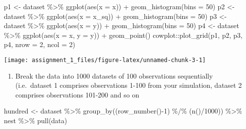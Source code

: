 \documentclass[
]{article}
\newenvironment{Shaded}{\begin{snugshade}}{\end{snugshade}}
\newcommand{\AttributeTok}[1]{\textcolor[rgb]{0.77,0.63,0.00}{#1}}
\newcommand{\DecValTok}[1]{\textcolor[rgb]{0.00,0.00,0.81}{#1}}
\newcommand{\FunctionTok}[1]{\textcolor[rgb]{0.00,0.00,0.00}{#1}}
\newcommand{\NormalTok}[1]{#1}
\newcommand{\OtherTok}[1]{\textcolor[rgb]{0.56,0.35,0.01}{#1}}
\newcommand{\SpecialCharTok}[1]{\textcolor[rgb]{0.00,0.00,0.00}{#1}}
\providecommand{\tightlist}{%
  \setlength{\itemsep}{0pt}\setlength{\parskip}{0pt}}
\begin{document}
\normalsize

\small

\begin{Shaded}
\begin{Highlighting}[]
\NormalTok{p1 }\OtherTok{\textless{}{-}}\NormalTok{ dataset }\SpecialCharTok{\%\textgreater{}\%}
    \FunctionTok{ggplot}\NormalTok{(}\FunctionTok{aes}\NormalTok{(}\AttributeTok{x =}\NormalTok{ x)) }\SpecialCharTok{+} \FunctionTok{geom\_histogram}\NormalTok{(}\AttributeTok{bins =} \DecValTok{50}\NormalTok{)}
\NormalTok{p2 }\OtherTok{\textless{}{-}}\NormalTok{ dataset }\SpecialCharTok{\%\textgreater{}\%}
    \FunctionTok{ggplot}\NormalTok{(}\FunctionTok{aes}\NormalTok{(}\AttributeTok{x =}\NormalTok{ x\_sq)) }\SpecialCharTok{+} \FunctionTok{geom\_histogram}\NormalTok{(}\AttributeTok{bins =} \DecValTok{50}\NormalTok{)}
\NormalTok{p3 }\OtherTok{\textless{}{-}}\NormalTok{ dataset }\SpecialCharTok{\%\textgreater{}\%}
    \FunctionTok{ggplot}\NormalTok{(}\FunctionTok{aes}\NormalTok{(}\AttributeTok{x =}\NormalTok{ y)) }\SpecialCharTok{+} \FunctionTok{geom\_histogram}\NormalTok{(}\AttributeTok{bins =} \DecValTok{50}\NormalTok{)}
\NormalTok{p4 }\OtherTok{\textless{}{-}}\NormalTok{ dataset }\SpecialCharTok{\%\textgreater{}\%}
    \FunctionTok{ggplot}\NormalTok{(}\FunctionTok{aes}\NormalTok{(}\AttributeTok{x =}\NormalTok{ x, }\AttributeTok{y =}\NormalTok{ y)) }\SpecialCharTok{+} \FunctionTok{geom\_point}\NormalTok{()}
\NormalTok{cowplot}\SpecialCharTok{::}\FunctionTok{plot\_grid}\NormalTok{(p1, p2, p3, p4, }\AttributeTok{nrow =} \DecValTok{2}\NormalTok{, }\AttributeTok{ncol =} \DecValTok{2}\NormalTok{)}
\end{Highlighting}
\end{Shaded}

\begin{center}\texttt{[image: assignment\_1\_files/figure-latex/unnamed-chunk-3-1]} \end{center}

\normalsize

\begin{enumerate}
\def\labelenumi{\alph{enumi}.}
\setcounter{enumi}{1}
\tightlist
\item
  Break the data into 1000 datasets of 100 observations sequentially
  (i.e.~dataset 1 comprises observations 1-100 from your simulation,
  dataset 2 comprises observations 101-200 and so on
\end{enumerate}

\small

\begin{Shaded}
\begin{Highlighting}[]
\NormalTok{hundred }\OtherTok{\textless{}{-}}\NormalTok{ dataset }\SpecialCharTok{\%\textgreater{}\%} 
   \FunctionTok{group\_by}\NormalTok{((}\FunctionTok{row\_number}\NormalTok{()}\SpecialCharTok{{-}}\DecValTok{1}\NormalTok{) }\SpecialCharTok{\%/\%}\NormalTok{ (}\FunctionTok{n}\NormalTok{()}\SpecialCharTok{/}\DecValTok{1000}\NormalTok{)) }\SpecialCharTok{\%\textgreater{}\%}
\NormalTok{   nest }\SpecialCharTok{\%\textgreater{}\%} \FunctionTok{pull}\NormalTok{(data)}
\end{Highlighting}
\end{Shaded}
\end{document}
